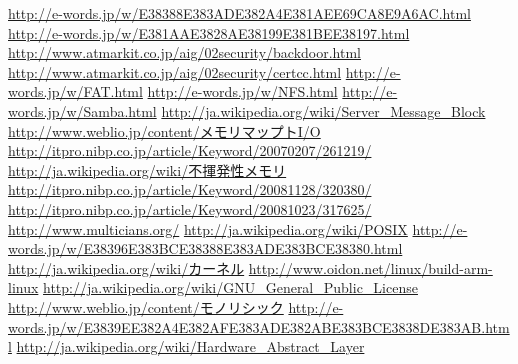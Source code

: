 \documentclass[a4paper, twocolumn]{jarticle}
\begin{document}
\begin{thebibliography}{9}
   \url{http://e-words.jp/w/E38388E383ADE382A4E381AEE69CA8E9A6AC.html}
   \url{http://e-words.jp/w/E381AAE3828AE38199E381BEE38197.html}
   \url{http://www.atmarkit.co.jp/aig/02security/backdoor.html}
   \url{http://www.atmarkit.co.jp/aig/02security/certcc.html}
   \url{http://e-words.jp/w/FAT.html}
   \url{http://e-words.jp/w/NFS.html}
   \url{http://e-words.jp/w/Samba.html}
   \url{http://ja.wikipedia.org/wiki/Server_Message_Block}
   \url{http://www.weblio.jp/content/メモリマップトI/O}
   \url{http://itpro.nibp.co.jp/article/Keyword/20070207/261219/}
   \url{http://ja.wikipedia.org/wiki/不揮発性メモリ}
   \url{http://itpro.nibp.co.jp/article/Keyword/20081128/320380/}
   \url{http://itpro.nibp.co.jp/article/Keyword/20081023/317625/}
   \url{http://www.multicians.org/}
   \url{http://ja.wikipedia.org/wiki/POSIX}
   \url{http://e-words.jp/w/E38396E383BCE38388E383ADE383BCE38380.html}
   \url{http://ja.wikipedia.org/wiki/カーネル}
   \url{http://www.oidon.net/linux/build-arm-linux}
   \url{http://ja.wikipedia.org/wiki/GNU_General_Public_License}
   \url{http://www.weblio.jp/content/モノリシック}
   \url{http://e-words.jp/w/E3839EE382A4E382AFE383ADE382ABE383BCE3838DE383AB.html}
   \url{http://ja.wikipedia.org/wiki/Hardware_Abstract_Layer}
\end{thebibliography}
\end{document}
